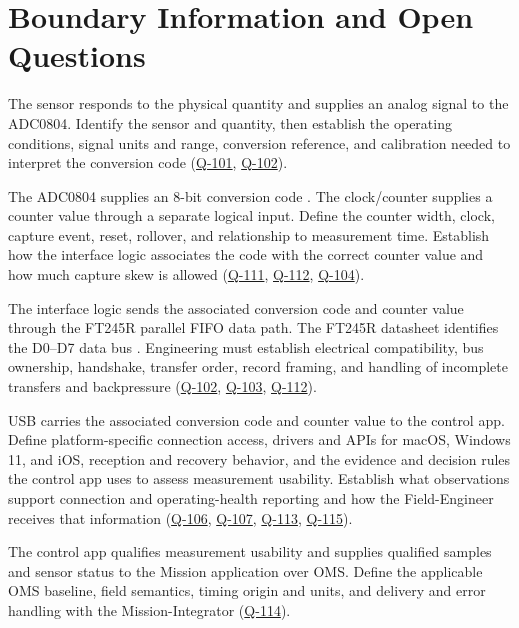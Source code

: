 \section{Boundary Information and Open Questions}
\label{Section:ContextBoundaryInformation}
\begin{description}[leftmargin=0pt,labelindent=0pt,labelsep=0pt,style=nextline]
\item[Physical quantity to sensor to ADC0804.]
The sensor responds to the physical quantity and supplies an analog signal
to the ADC0804. Identify the sensor and quantity, then establish the
operating conditions, signal units and range, conversion reference, and
calibration needed to interpret the conversion code
(\hyperref[Question:Q-101]{Q-101}, \hyperref[Question:Q-102]{Q-102}).

\item[ADC0804 and clock/counter to interface logic.]
The ADC0804 supplies an 8-bit conversion code \cite{ADC0804Datasheet}.
The clock/counter supplies a counter value through a separate logical input.
Define the counter width, clock, capture event, reset, rollover, and
relationship to measurement time. Establish how the interface logic associates
the code with the correct counter value and how much capture skew is allowed
(\hyperref[Question:Q-111]{Q-111}, \hyperref[Question:Q-112]{Q-112},
\hyperref[Question:Q-104]{Q-104}).

\item[Interface logic to FT245R.]
The interface logic sends the associated conversion code and counter value
through the FT245R parallel FIFO data path. The FT245R datasheet identifies
the D0--D7 data bus \cite{FT245RDatasheet}. Engineering must establish
electrical compatibility, bus ownership, handshake, transfer order,
record framing, and handling of incomplete transfers and backpressure
(\hyperref[Question:Q-102]{Q-102}, \hyperref[Question:Q-103]{Q-103},
\hyperref[Question:Q-112]{Q-112}).

\item[FT245R to control app.]
USB carries the associated conversion code and counter value to the control
app. Define platform-specific connection access, drivers and APIs for macOS, Windows 11, and iOS, reception and recovery behavior, and
the evidence and decision rules the control app uses to assess measurement
usability. Establish what observations support connection and operating-health
reporting and how the Field-Engineer receives that information
(\hyperref[Question:Q-106]{Q-106}, \hyperref[Question:Q-107]{Q-107},
\hyperref[Question:Q-113]{Q-113}, \hyperref[Question:Q-115]{Q-115}).

\item[Control app to Mission application.]
The control app qualifies measurement usability and supplies qualified samples
and sensor status to the Mission application over OMS. Define the applicable
OMS baseline, field semantics, timing origin and units, and delivery and
error handling with the Mission-Integrator
(\hyperref[Question:Q-114]{Q-114}).
\end{description}

